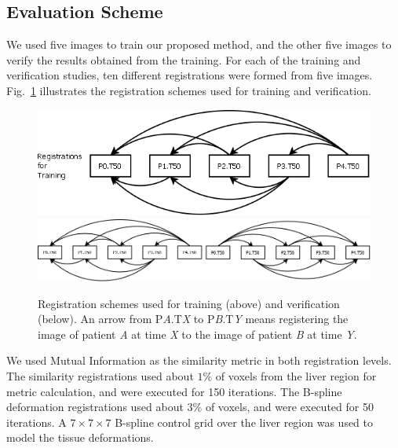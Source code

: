 \documentclass[]{spie}  %
\begin{document}
\subsection{Evaluation Scheme}

We used five images to train our proposed method, and the other five images to verify the results obtained from the training. For each of the training and verification studies, ten different registrations were formed from five images.
Fig.~\ref{fig:testing_schemes} illustrates the registration schemes used for training and verification.

\begin{figure}[b!]
\begin{center}
\includegraphics[width=5in]{registrations_for_training}
\includegraphics[width=5in]{registrations_for_validation}
\end{center}
\caption{Registration schemes used for training (above) and verification (below). An arrow from P\textit{A}.T\textit{X} to P\textit{B}.T\textit{Y} means registering the image of patient \textit{A} at time \textit{X} to the image of patient \textit{B} at time \textit{Y}.}
\label{fig:testing_schemes}
\end{figure}

We used Mutual Information \cite{Mattes03:TMI} as the similarity metric in
both registration levels. The similarity registrations used about $1\%$ of
voxels from the liver region for metric calculation, and were executed for
150 iterations. The B-spline deformation registrations used about $3\%$ of
voxels, and were executed for 50 iterations. A $7 \times 7 \times 7$ B-spline
control grid over the liver region was used to model the tissue deformations.
\end{document}
